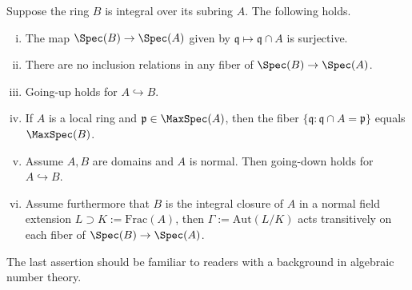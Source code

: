 \begin{theorem}\label{prop:Cohen-Seidenberg}
	Suppose the ring $B$ is integral over its subring $A$. The following holds.
	\begin{enumerate}[(i)]
		\item The map $\Spec(B) \to \Spec(A)$ given by $\mathfrak{q} \mapsto \mathfrak{q} \cap A$ is surjective.
		\item There are no inclusion relations in any fiber of $\Spec(B) \to \Spec(A)$.
		\item Going-up holds for $A \hookrightarrow B$.
		\item If $A$ is a local ring and $\mathfrak{p} \in \MaxSpec(A)$, then the fiber $\{ \mathfrak{q} : \mathfrak{q} \cap A = \mathfrak{p} \}$ equals $\MaxSpec(B)$.
		\item Assume $A,B$ are domains and $A$ is normal. Then going-down holds for $A \hookrightarrow B$.
		\item Assume furthermore that $B$ is the integral closure of $A$ in a normal field extension $L \supset K := \mathrm{Frac}(A)$, then $\Gamma := \mathrm{Aut}(L/K)$ acts transitively on each fiber of $\Spec(B) \to \Spec
		(A)$.
	\end{enumerate}
\end{theorem}
The last assertion should be familiar to readers with a background in algebraic number theory.
